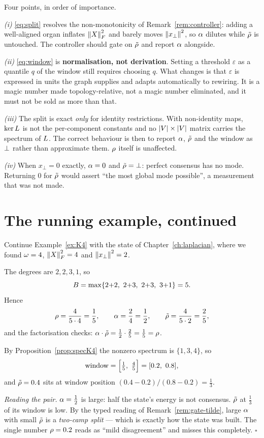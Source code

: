 \begin{hon}\Hon
Four points, in order of importance.

\emph{(i)} \eqref{eq:split} resolves the non-monotonicity of
Remark~\ref{rem:controller}: adding a well-aligned organ inflates
$\left\lVert X \right\rVert_F^2$ and barely moves $\left\lVert x_\perp \right\rVert^2$, so $\alpha$
dilutes while $\tilde{\rho}$ is untouched. The controller should gate on
$\tilde{\rho}$ and report $\alpha$ alongside.

\emph{(ii)} \eqref{eq:window} is \textbf{normalisation, not derivation}.
Setting a threshold $\varepsilon$ as a quantile $q$ of the window still
requires choosing $q$. What changes is that $\varepsilon$ is expressed
in units the graph supplies and adapts automatically to rewiring. It is
a magic number made topology-relative, not a magic number eliminated,
and it must not be sold as more than that.

\emph{(iii)} The split is exact \emph{only} for identity restrictions.
With non-identity maps, $\ker L$ is not the per-component constants
and no $\left\lvert V \right\rvert\times\left\lvert V \right\rvert$ matrix carries the spectrum of $L$. The
correct behaviour is then to report $\alpha$, $\tilde{\rho}$ and the window
as $\bot$ rather than approximate them. $\rho$ itself is unaffected.

\emph{(iv)} When $x_\perp=0$ exactly, $\alpha=0$ and $\tilde{\rho}=\bot$:
perfect consensus has no mode. Returning $0$ for $\tilde{\rho}$ would assert
``the most global mode possible'', a measurement that was not made.
\end{hon}

\section{The running example, continued}

\begin{workedbox}\Worked
Continue Example~\ref{ex:K4} with the state of
Chapter~\ref{ch:laplacian}, where we found $\omega=4$,
$\left\lVert X \right\rVert_F^2=4$ and $\left\lVert x_\perp \right\rVert^2=2$.

The degrees are $2,2,3,1$, so
\[
  \AM=\max\{2{+}2,\ 2{+}3,\ 2{+}3,\ 3{+}1\}=5 .
\]
Hence
\[
  \rho=\frac{4}{5\cdot4}=\frac15,
  \qquad
  \alpha=\frac{2}{4}=\frac12,
  \qquad
  \tilde{\rho}=\frac{4}{5\cdot2}=\frac25,
\]
and the factorisation checks:
$\alpha\cdot\tilde{\rho}=\tfrac12\cdot\tfrac25=\tfrac15=\rho$.

By Proposition~\ref{prop:specK4} the nonzero spectrum is $\{1,3,4\}$, so
\[
  \text{window}=\Bigl[\tfrac{1}{5},\ \tfrac{4}{5}\Bigr]=[0.2,\ 0.8],
\]
and $\tilde{\rho}=0.4$ sits at window position
$(0.4-0.2)/(0.8-0.2)=\tfrac13$.

\emph{Reading the pair.} $\alpha=\tfrac12$ is large: half the state's
energy is not consensus. $\tilde{\rho}$ at $\tfrac13$ of its window is low.
By the typed reading of Remark~\ref{rem:gate-tilde}, large $\alpha$
with small $\tilde{\rho}$ is a \emph{two-camp split} --- which is exactly how
the state was built. The single number $\rho=0.2$ reads as ``mild
disagreement'' and misses this completely.
\hfill$\square$
\end{workedbox}

